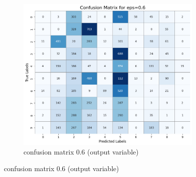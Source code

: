 \documentclass[11pt,onside]{article}
\begin{document}
\begin{figure}[h]
  \centering
  \begin{subfigure}[b]{0.49\textwidth}
    \centering
    \includegraphics[width=\textwidth]{V2_images/_correct_labels_confusion_matrix_eps_0.6.png}
    \caption{confusion matrix 0.6 (output variable)}
    \label{fig:image1}
  \end{subfigure}
\end{figure}

\clearpage %
\end{document}
